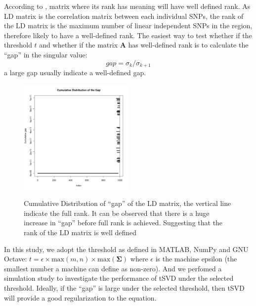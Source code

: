			According to \citet{Hansen1987}, matrix where its rank has meaning will have well defined rank. 
			As \gls{LD} matrix is the correlation matrix between each individual \glspl{SNP}, the rank of the \gls{LD} matrix is the maximum number of linear independent \glspl{SNP} in the region, therefore likely to have a well-defined rank. 
			The easiest way to test whether if the threshold $t$ and whether if the matrix $\boldsymbol{A}$ has well-defined rank is to calculate the ``gap'' in the singular value:
			\begin{equation}
			gap = \sigma_k/\sigma_{k+1}
			\label{eq:gapSingular}
			\end{equation}
			a large gap usually indicate a well-defined gap. 
			\begin{figure}
				\caption[Cumulative Distribution of ``gap'' of the LD matrix]{Cumulative Distribution of ``gap'' of the LD matrix, the vertical line indicate the full rank. It can be observed that there is a huge increase in ``gap'' before full rank is achieved. Suggesting that the rank of the LD matrix is well defined}
				\centering
				\includegraphics[width=0.5\textwidth]{figure/singular_value_distribution.png}
				\label{fig:singularValueDist}
				\vspace{-20pt}
			\end{figure}
			In this study, we adopt the threshold as defined in MATLAB, NumPy and GNU Octave: $t=\epsilon\times\mathrm{max}(m,n)\times\mathrm{max}(\boldsymbol{\Sigma})$ where $\epsilon$ is the machine epsilon (the smallest number a machine can define as non-zero). 
			And we perfomed a simulation study to investigate the performance of \gls{tSVD} under the selected threshold.
			Ideally, if the ``gap'' is large under the selected threshold, then \gls{tSVD} will provide a good regularization to the equation. 
			
